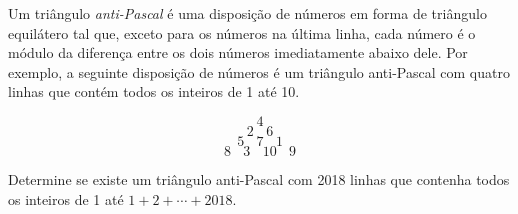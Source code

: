 Um triângulo \textit{anti-Pascal} é uma disposição de números em forma de triângulo equilátero tal que, exceto para os números na última linha, cada número é o módulo da diferença entre os dois números imediatamente abaixo dele. Por exemplo, a seguinte disposição de números é um
triângulo anti-Pascal com quatro linhas que contém todos os inteiros de 1 até 10.

$$4$$%
$$2\ \ \ \ 6$$%
$$5\ \ \ \ 7\ \ \ \ 1$$%
$$8\ \ \ \ 3\ \ \ \ 10\ \ \ \ 9$$%

Determine se existe um triângulo anti-Pascal com 2018 linhas que contenha todos os inteiros de 1 até $1 + 2 + \cdots + 2018$.